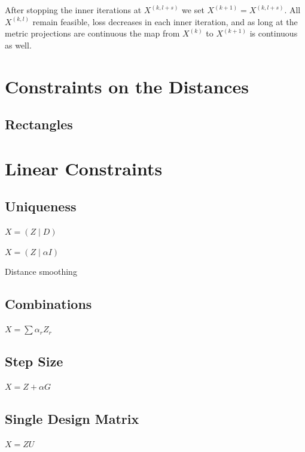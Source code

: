 \documentclass[
  12pt,
]{book}
\theoremstyle{definition}
\theoremstyle{definition}
\theoremstyle{definition}
\theoremstyle{definition}
\theoremstyle{remark}
\begin{document}
After stopping the inner iterations at \(X^{(k,l+s)}\) we set \(X^{(k+1)}=X^{(k,l+s)}\).
All \(X^{(k,l)}\) remain feasible, loss decreases in each inner iteration, and as long at the metric projections are continuous the map from \(X^{(k)}\) to \(X^{(k+1)}\) is continuous as well.

\hypertarget{constraints-on-the-distances}{%
\section{Constraints on the Distances}\label{constraints-on-the-distances}}

\hypertarget{rectangles}{%
\subsection{Rectangles}\label{rectangles}}

\hypertarget{lincons}{%
\section{Linear Constraints}\label{lincons}}

\hypertarget{uniqueness}{%
\subsection{Uniqueness}\label{uniqueness}}

\(X=(Z\mid D)\)

\(X=(Z\mid \alpha I)\)

Distance smoothing

\hypertarget{combinations}{%
\subsection{Combinations}\label{combinations}}

\(X=\sum\alpha_r Z_r\)

\hypertarget{stepsize}{%
\subsection{Step Size}\label{stepsize}}

\(X=Z+\alpha G\)

\hypertarget{singdesign}{%
\subsection{Single Design Matrix}\label{singdesign}}

\(X=ZU\)
\end{document}

